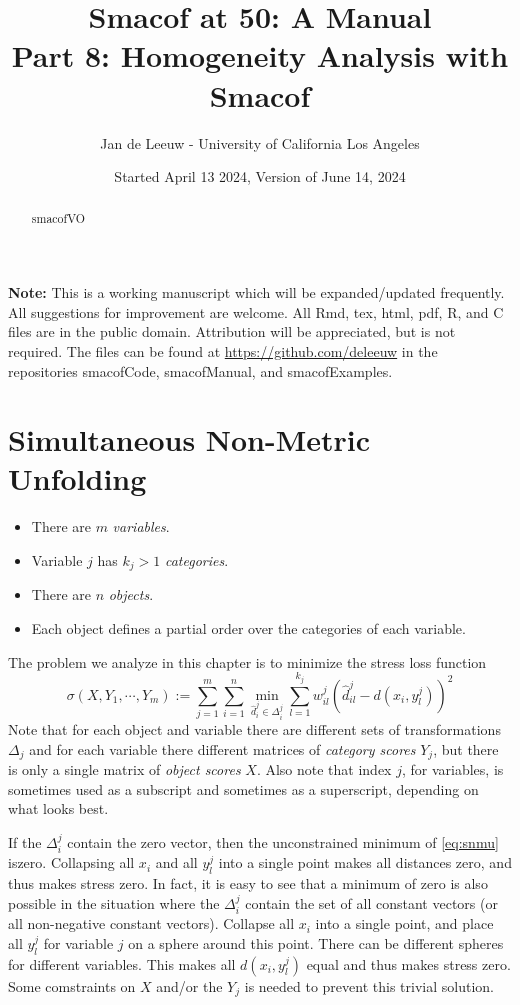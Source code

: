 \documentclass[
  12pt,
]{article}
\title{Smacof at 50: A Manual\\
Part 8: Homogeneity Analysis with Smacof}
\author{Jan de Leeuw - University of California Los Angeles}
\date{Started April 13 2024, Version of June 14, 2024}
\providecommand{\tightlist}{%
  \setlength{\itemsep}{0pt}\setlength{\parskip}{0pt}}
\begin{document}
\maketitle
\begin{abstract}
smacofVO
\end{abstract}

{
\setcounter{tocdepth}{3}
\tableofcontents
}
\textbf{Note:} This is a working manuscript which will be expanded/updated
frequently. All suggestions for improvement are welcome. All Rmd, tex,
html, pdf, R, and C files are in the public domain. Attribution will be
appreciated, but is not required. The files can be found at
\url{https://github.com/deleeuw} in the repositories smacofCode, smacofManual,
and smacofExamples.

\section{Simultaneous Non-Metric Unfolding}\label{snmu}

\begin{itemize}
\tightlist
\item
  There are \(m\) \emph{variables}.
\item
  Variable \(j\) has \(k_j>1\) \emph{categories}.
\item
  There are \(n\) \emph{objects}.
\item
  Each object defines a partial order over the categories of each variable.
\end{itemize}

The problem we analyze in this chapter is to minimize the stress loss function
\begin{equation}
\sigma(X,Y_1,\cdots,Y_m):=\sum_{j=1}^m\sum_{i=1}^n\min_{\hat d_i^j\in\Delta_i^j}\sum_{l=1}^{k_j}w_{il}^j(\hat d_{il}^j-d(x_i,y_l^j))^2
\label{eq:snmu}
\end{equation}
Note that for each object and variable there are different sets of transformations \(\Delta_j\)
and for each variable there different matrices of \emph{category scores} \(Y_j\), but there is only a single matrix of \emph{object scores} \(X\). Also note that index \(j\), for variables, is sometimes used as a subscript and sometimes as a superscript, depending on what looks best.

If the \(\Delta_i^j\) contain the zero vector, then the unconstrained minimum of \eqref{eq:snmu} iszero. Collapsing all \(x_i\) and all \(y_l^j\) into a single point makes all distances zero, and thus makes stress zero.
In fact, it is easy to see that a minimum of zero is also possible in the situation where the \(\Delta_i^j\) contain the
set of all constant vectors (or all non-negative constant vectors). Collapse all
\(x_i\) into a single point, and place all \(y_l^j\) for variable \(j\) on a sphere around this point. There can be different spheres for different variables. This makes all \(d(x_i,y_l^j)\) equal and thus makes stress zero.
Some comstraints on \(X\) and/or the \(Y_j\) is needed to prevent this trivial solution.
\end{document}
